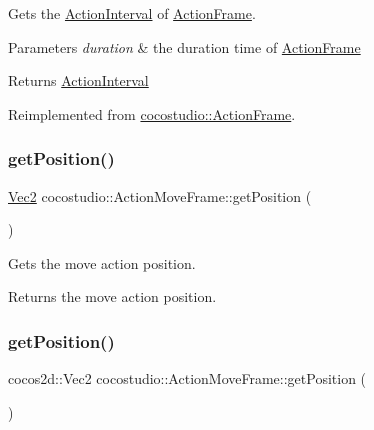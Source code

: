 Gets the \hyperlink{classActionInterval}{Action\+Interval} of \hyperlink{classcocostudio_1_1ActionFrame}{Action\+Frame}.


\begin{DoxyParams}{Parameters}
{\em duration} & the duration time of \hyperlink{classcocostudio_1_1ActionFrame}{Action\+Frame}\\
\hline
\end{DoxyParams}
\begin{DoxyReturn}{Returns}
\hyperlink{classActionInterval}{Action\+Interval} 
\end{DoxyReturn}


Reimplemented from \hyperlink{classcocostudio_1_1ActionFrame_a375216a44f6643d5e771299b1236dc51}{cocostudio\+::\+Action\+Frame}.

\mbox{\label{classcocostudio_1_1ActionMoveFrame_a29d4eca3655e5c12062b5447ee89fbfa}} 
\subsubsection{\texorpdfstring{get\+Position()}{getPosition()}\hspace{0.1cm}{\footnotesize\ttfamily [1/2]}}
{\footnotesize\ttfamily \hyperlink{classVec2}{Vec2} cocostudio\+::\+Action\+Move\+Frame\+::get\+Position (\begin{DoxyParamCaption}{ }\end{DoxyParamCaption})}

Gets the move action position.

\begin{DoxyReturn}{Returns}
the move action position. 
\end{DoxyReturn}
\mbox{\label{classcocostudio_1_1ActionMoveFrame_a68dc486d34f7127625b6cacb4388b973}} 
\subsubsection{\texorpdfstring{get\+Position()}{getPosition()}\hspace{0.1cm}{\footnotesize\ttfamily [2/2]}}
{\footnotesize\ttfamily cocos2d\+::\+Vec2 cocostudio\+::\+Action\+Move\+Frame\+::get\+Position (\begin{DoxyParamCaption}{ }\end{DoxyParamCaption})}

